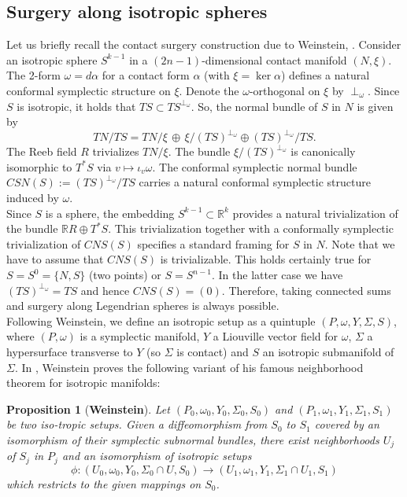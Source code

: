 \documentclass[a4paper,12pt,bibliography=totocnumbered,titlepage=false,abstracton,bookmarksnumbered=true]{scrartcl}
\newtheorem{prop}[defn]{Proposition}
\theoremstyle{definition}
\begin{document}
\subsection{Surgery along isotropic spheres}
Let us briefly recall the contact surgery construction due to Weinstein, \cite{Wein}. Consider an isotropic sphere $S^{k-1}$ in a $(2n-1)$-dimensional contact manifold $(N,\xi)$. The 2-form $\omega=d\alpha$ for a contact form $\alpha$ (with $\xi=\ker\alpha$) defines a natural conformal symplectic structure on $\xi$. Denote the $\omega$-orthogonal on $\xi$ by $\perp_\omega$. Since $S$ is isotropic, it holds that $TS\subset TS^{\perp_\omega}$. So, the normal bundle of $S$ in $N$ is given by
\[ TN/ TS= TN/ \xi \,\oplus\, \xi/(TS)^{\perp_\omega} \oplus (TS)^{\perp_\omega}/ TS.\]
The Reeb field $R$ trivializes $TN/\xi$. The bundle $\xi/(TS)^{\perp_\omega}$ is canonically isomorphic to $T^\ast S$ via $v\mapsto \iota_v\omega$. The conformal symplectic normal bundle $CSN(S):=(TS)^{\perp_\omega}/TS$ carries a natural conformal symplectic structure induced by $\omega$.\\
Since $S$ is a sphere, the embedding $S^{k-1}\subset\mathbb{R}^k$ provides a natural trivialization of the bundle $\mathbb{R}R\oplus T^\ast S$. This trivialization together with a conformally symplectic trivialization of $CNS(S)$ specifies a standard framing for $S$ in $N$. Note that we have to assume that $CNS(S)$ is trivializable. This holds certainly true for $S=S^0 =\{N,S\}$ (two points) or $S=S^{n-1}$. In the latter case we have $(TS)^{\perp_\omega}=TS$ and hence $CNS(S)=(0)$. Therefore, taking connected sums and surgery along Legendrian spheres is always possible.\\ 
Following Weinstein, we define an isotropic setup as a quintuple $(P,\omega,Y,\Sigma,S)$, where $(P,\omega)$ is a symplectic manifold, $Y$ a Liouville vector field for $\omega$, $\Sigma$ a hypersurface transverse to $Y$ (so $\Sigma$ is contact) and $S$ an isotropic submanifold of $\Sigma$. In \cite{Wein}, Weinstein proves the following variant of his famous neighborhood theorem for isotropic manifolds:
\begin{prop}[\textbf{Weinstein}] \label{X}
 Let $(P_0,\omega_0,Y_0,\Sigma_0,S_0)$ and $(P_1,\omega_1,Y_1,\Sigma_1,S_1)$ be two iso-tropic setups. Given a diffeomorphism from $S_0$ to $S_1$ covered by an isomorphism of their symplectic subnormal bundles, there exist neighborhoods $U_j$ of $S_j$ in $P_j$ and an isomorphism of isotropic setups
 \[\phi : (U_0,\omega_0,Y_0,\Sigma_0\cap U,S_0) \rightarrow (U_1,\omega_1,Y_1,\Sigma_1\cap U_1,S_1)\]
 which restricts to the given mappings on $S_0$.
\end{prop}
\end{document}
